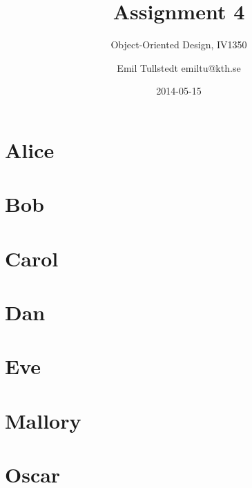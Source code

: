 \documentclass[a4paper]{scrreprt}
\title{Assignment 4}
\subtitle{Object-Oriented Design, IV1350}
\author{Emil Tullstedt emiltu@kth.se}
\date{2014-05-15}
\begin{document}
\chapter{Alice}



\chapter{Bob}



\chapter{Carol}



\chapter{Dan}



\chapter{Eve}



\chapter{Mallory}



\chapter{Oscar}


\end{document}
